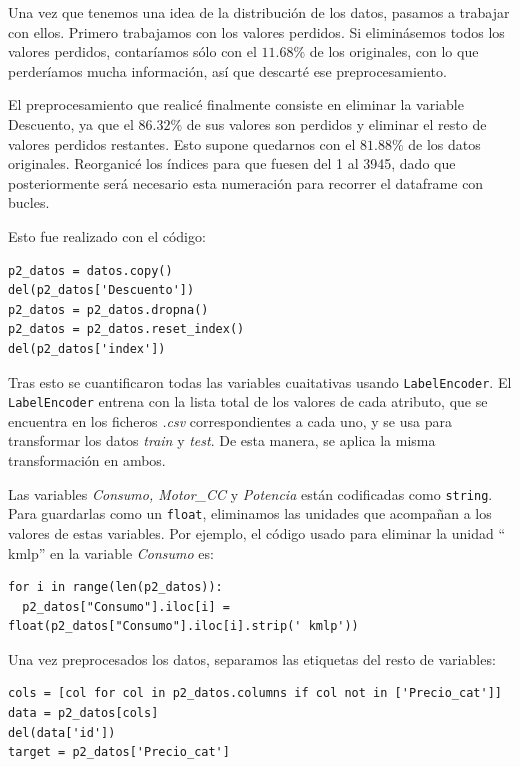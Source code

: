 \documentclass[a4]{article}
\begin{document}
Una vez que tenemos una idea de la distribución de los datos, pasamos a trabajar con ellos. Primero trabajamos con los valores perdidos. Si eliminásemos todos los valores perdidos, contaríamos sólo con el $11.68\%$ de los originales, con lo que perderíamos mucha información, así que descarté ese preprocesamiento.

El preprocesamiento que realicé finalmente consiste en eliminar la variable Descuento, ya que el $86.32\%$ de sus valores son perdidos y eliminar el resto de valores perdidos restantes. Esto supone quedarnos con el $81.88\%$ de los datos originales. Reorganicé los índices para que fuesen del 1 al 3945, dado que posteriormente será necesario esta numeración para recorrer el dataframe con bucles.

Esto fue realizado con el código:

\begin{lstlisting}
p2_datos = datos.copy()
del(p2_datos['Descuento'])
p2_datos = p2_datos.dropna()
p2_datos = p2_datos.reset_index()
del(p2_datos['index'])
\end{lstlisting}

Tras esto se cuantificaron todas las variables cuaitativas usando \texttt{LabelEncoder}. El \texttt{LabelEncoder} entrena con la lista total de los valores de cada atributo, que se encuentra en los ficheros \textit{.csv} correspondientes a cada uno, y se usa para transformar los datos \textit{train} y \textit{test}. De esta manera, se aplica la misma transformación en ambos.

Las variables \textit{Consumo, Motor\_CC} y \textit{Potencia} están codificadas como \texttt{string}. Para guardarlas como un \texttt{float}, eliminamos las unidades que acompañan a los valores de estas variables. Por ejemplo, el código usado para eliminar la unidad `` kmlp'' en la variable \textit{Consumo} es:

\begin{lstlisting}
for i in range(len(p2_datos)):
  p2_datos["Consumo"].iloc[i] = float(p2_datos["Consumo"].iloc[i].strip(' kmlp'))
\end{lstlisting}

Una vez preprocesados los datos, separamos las etiquetas del resto de variables:

\begin{lstlisting}
cols = [col for col in p2_datos.columns if col not in ['Precio_cat']]
data = p2_datos[cols]
del(data['id'])
target = p2_datos['Precio_cat']
\end{lstlisting}
\end{document}
